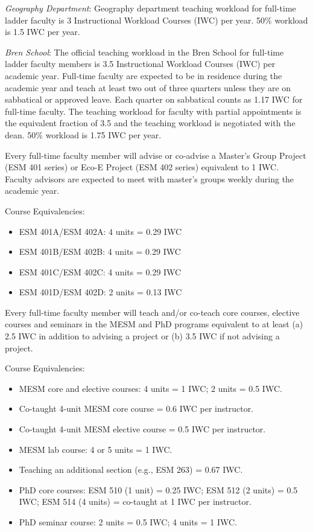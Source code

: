 \documentclass[10pt]{article}
\begin{document}
\begin{enumerate}
{\footnotesize

\item {\em Geography Department}: Geography department teaching workload for full-time ladder faculty is 3 Instructional Workload Courses (IWC) per year. 50\% workload is 1.5 IWC per year.

\item {\em Bren School}:  The official teaching workload in the Bren School for full-time ladder faculty members is 3.5 Instructional Workload Courses (IWC) per academic year. Full-time faculty are expected to be in residence during the academic year and teach at least two out of three quarters unless they are on sabbatical or approved leave. Each quarter on sabbatical counts as 1.17 IWC for full-time faculty. The teaching workload for faculty with partial appointments is the equivalent fraction of 3.5 and the teaching workload is negotiated with the dean. 50\% workload is 1.75 IWC per year.

Every full-time faculty member will advise or co-advise a Master’s Group Project (ESM 401 series) or Eco-E Project (ESM 402 series) equivalent to 1 IWC. Faculty advisors are expected to meet with master’s groups weekly during the academic year.

Course Equivalencies:
\begin{itemize}
    \item ESM 401A/ESM 402A: 4 units = 0.29 IWC 
    \item ESM 401B/ESM 402B: 4 units = 0.29 IWC
    \item ESM 401C/ESM 402C: 4 units = 0.29 IWC
    \item ESM 401D/ESM 402D: 2 units = 0.13 IWC
\end{itemize}

Every full-time faculty member will teach and/or co-teach core courses, elective courses and seminars in the MESM and PhD programs equivalent to at least (a) 2.5 IWC in addition to advising a project or (b) 3.5 IWC if not advising a project. 

Course Equivalencies:
\begin{itemize}
    \item MESM core and elective courses: 4 units = 1 IWC; 2 units = 0.5 IWC.
    \item Co-taught 4-unit MESM core course = 0.6 IWC per instructor.
    \item Co-taught 4-unit MESM elective course = 0.5 IWC per instructor.
    \item MESM lab course: 4 or 5 units = 1 IWC.
    \item Teaching an additional section (e.g., ESM 263) = 0.67 IWC.
    \item PhD core courses: ESM 510 (1 unit) = 0.25 IWC; ESM 512 (2 units) = 0.5 IWC; ESM 514 (4 units) = co-taught at 1 IWC per instructor.
    \item PhD seminar course: 2 units = 0.5 IWC; 4 units = 1 IWC.
\end{itemize}

}
\end{enumerate}
\end{document}
